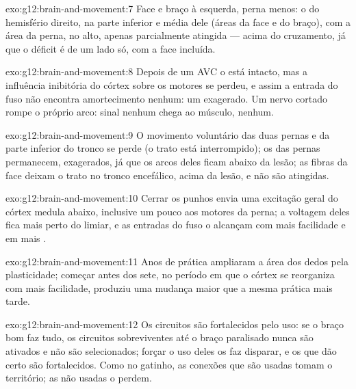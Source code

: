 \begin{solution}{exo:g12:brain-and-movement:7}
Face e braço à esquerda, perna menos: o  do hemisfério
direito, na parte inferior e média dele (áreas da face e do braço), com
a área da perna, no alto, apenas parcialmente atingida --- acima do
cruzamento, já que o déficit é de um lado só, com a face incluída.
\end{solution}

\begin{solution}{exo:g12:brain-and-movement:8}
Depois de um AVC o  está intacto, mas a influência
inibitória do córtex sobre os  motores se perdeu, e assim a
entrada do fuso não encontra amortecimento nenhum: um 
exagerado. Um nervo cortado rompe o próprio arco: sinal nenhum chega ao
músculo,  nenhum.
\end{solution}

\begin{solution}{exo:g12:brain-and-movement:9}
O movimento voluntário das duas pernas e da parte inferior do tronco se
perde (o trato está interrompido); os  das pernas permanecem,
exagerados, já que os arcos deles ficam abaixo da lesão; as fibras da
face deixam o trato no tronco encefálico, acima da lesão, e não são atingidas.
\end{solution}

\begin{solution}{exo:g12:brain-and-movement:10}
Cerrar os punhos envia uma excitação geral do córtex medula abaixo,
inclusive um pouco aos  motores da perna; a voltagem deles
fica mais perto do limiar, e as entradas do fuso o alcançam com mais
facilidade e em mais .
\end{solution}

\begin{solution}{exo:g12:brain-and-movement:11}
Anos de prática ampliaram a área dos dedos pela plasticidade; começar
antes dos sete, no período em que o córtex se reorganiza com mais
facilidade, produziu uma mudança maior que a mesma prática mais tarde.
\end{solution}

\begin{solution}{exo:g12:brain-and-movement:12}
Os circuitos são fortalecidos pelo uso: se o braço bom faz tudo, os
circuitos sobreviventes até o braço paralisado nunca são ativados e não
são selecionados; forçar o uso deles os faz disparar, e os que dão
certo são fortalecidos. Como no gatinho, as conexões que são usadas
tomam o território; as não usadas o perdem.
\end{solution}

